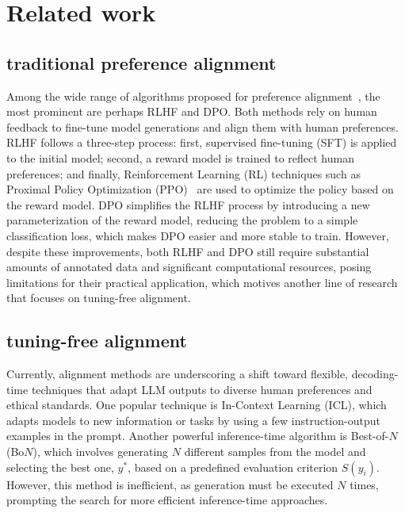 \section{Related work}
\subsection{traditional preference alignment}
	Among the wide range of algorithms proposed for preference alignment~\citep{stiennon2020learning,Yuan2023RRHFRR,rafailov2023direct,zhu2024lire}, the most prominent are perhaps RLHF and DPO. Both methods rely on human feedback to fine-tune model generations and align them with human preferences.
	RLHF follows a three-step process: first, supervised fine-tuning (SFT) is applied to the initial model; second, a reward model is trained to reflect human preferences; and finally, Reinforcement Learning (RL) techniques such as Proximal Policy Optimization (PPO)~\citep{schulman2017proximal} are used to optimize the policy based on the reward model.
	DPO simplifies the RLHF process by introducing a new parameterization of the reward model, reducing the problem to a simple classification loss, which makes DPO easier and more stable to train. However, despite these improvements, both RLHF and DPO still require substantial amounts of annotated data and significant computational resources, posing limitations for their practical application, which motives another line of research that focuses on tuning-free alignment.
	\subsection{tuning-free alignment}
Currently, alignment methods are underscoring a shift toward flexible, decoding-time techniques that adapt LLM outputs to diverse human preferences and ethical standards. One popular technique is In-Context Learning (ICL), which adapts models to new information or tasks by using a few instruction-output examples in the prompt. Another powerful inference-time algorithm is Best-of-$N$ (Bo$N$), which involves generating $N$ different samples from the model and selecting the best one, $y^*$, based on a predefined evaluation criterion $S(y_i)$. However, this method is inefficient, as generation must be executed $N$ times, prompting the search for more efficient inference-time approaches.

